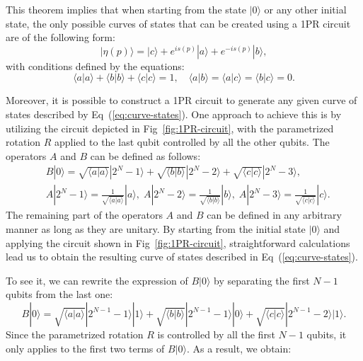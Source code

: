 \documentclass[10pt,letterpaper]{article} %
\newcommand{\fref}[1]{Fig~\ref{#1}}
\newcommand{\eref}[1]{Eq~(\ref{#1})}
\begin{document}
This theorem implies that when starting from the state $|0\rangle$ 
or any other initial state, the only possible curves of states that can be 
created using a 1PR circuit are of the following form:
\begin{equation}
|\eta(p)\rangle = |c\rangle + e^{is(p)}|a\rangle + e^{-is(p)} |b\rangle,
\label{eq:curve-states}
\end{equation}
with conditions defined by the equations: 
\begin{equation}
\langle a| a\rangle + \langle b| b\rangle + \langle c| c\rangle = 1,  \quad
\langle a |b\rangle =
\langle a |c\rangle =
\langle b |c\rangle = 0.
\label{eq:conditions-vecs}
\end{equation}

Moreover, it is possible to construct a 1PR circuit to generate any given curve of 
states described by \eref{eq:curve-states}. 
One approach to achieve this is by utilizing the circuit 
depicted in \fref{fig:1PR-circuit}, 
with the parametrized rotation $R$ applied to the last qubit controlled by all the 
other qubits. The operators $A$ and $B$ can be defined as follows:
\begin{align*}
&B|0\rangle = \sqrt{\langle a | a \rangle} |2^{N}-1 \rangle + \sqrt{\langle b | b \rangle} |2^{N}-2\rangle + \sqrt{\langle c |c \rangle} |2^N-3\rangle, \\
&A|2^N-1 \rangle = \frac{1}{\sqrt{\langle a | a \rangle}} |a\rangle,\; A|2^{N}-2\rangle = \frac{1}{\sqrt{\langle b | b \rangle}}|b\rangle, \; A|2^{N}-3\rangle = \frac{1}{\sqrt{\langle c | c \rangle}}|c\rangle.
\end{align*}
The remaining part of the operators $A$ and $B$ can be defined
in any arbitrary manner as long as they are unitary.
By starting from the initial state $|0\rangle$ and 
applying the circuit shown in \fref{fig:1PR-circuit}, straightforward calculations 
lead us to obtain the resulting curve of states described in \eref{eq:curve-states}.

To see it, we can rewrite the expression of $B|0\rangle$ by 
separating the first $N-1$ qubits from the last one:
$$B|0\rangle = \sqrt{\langle a | a \rangle} |2^{N-1}-1\rangle |1\rangle + \sqrt{\langle b | b \rangle} |2^{N-1}-1\rangle |0\rangle + \sqrt{\langle c | c \rangle} |2^{N-1}-2\rangle |1\rangle.$$
Since the parametrized rotation $R$ is controlled by all the first $N-1$ qubits, it only applies to the first two terms of $B|0\rangle$. As a result, we obtain:
\end{document}
